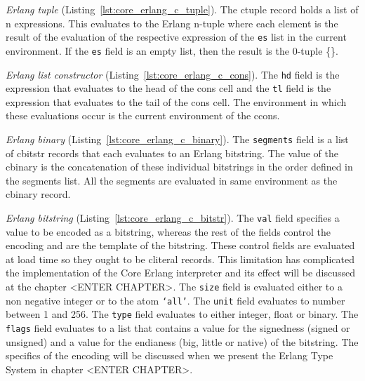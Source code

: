 
\emph{Erlang tuple} (Listing~\ref{lst:core_erlang_c_tuple}).
The c\textunderscore tuple record holds a list of n expressions. This evaluates to the Erlang
n-tuple where each element is the result of the evaluation of the respective
expression of the \texttt{es} list in the current environment. If the \texttt{es} field is an
empty list, then the result is the 0-tuple \{\}.



\emph{Erlang list constructor} (Listing~\ref{lst:core_erlang_c_cons}).
The \texttt{hd} field is the expression that evaluates to the head of the cons cell and
the \texttt{tl} field is the expression that evaluates to the tail of the cons cell. The
environment in which these evaluations occur is the current environment of the
c\textunderscore cons.



\emph{Erlang binary} (Listing~\ref{lst:core_erlang_c_binary}).
The \texttt{segments} field is a list of c\textunderscore bitstr records that each evaluates to an Erlang
bitstring. The value of the c\textunderscore binary is the concatenation of these individual
bitstrings in the order defined in the segments list. All the segments are
evaluated in same environment as the c\textunderscore binary record.



\emph{Erlang bitstring} (Listing~\ref{lst:core_erlang_c_bitstr}).
The \texttt{val} field specifies a value to be encoded as a bitstring, whereas the rest
of the fields control the encoding and are the template of the bitstring. These
control fields are evaluated at load time so they ought to be c\textunderscore literal
records. This limitation has complicated the implementation of the Core Erlang
interpreter and its effect will be discussed at the chapter <ENTER CHAPTER>.
The \texttt{size} field is evaluated either to a non negative integer or to the atom
\texttt{‘all’}. The \texttt{unit} field evaluates to number between 1 and 256. The \texttt{type} field
evaluates to either integer, float or binary. The \texttt{flags} field evaluates to a
list that contains a value for the signedness (signed or unsigned) and a value
for the endianess (big, little or native) of the bitstring. The specifics of
the encoding will be discussed when we present the Erlang Type System in
chapter <ENTER CHAPTER>.

